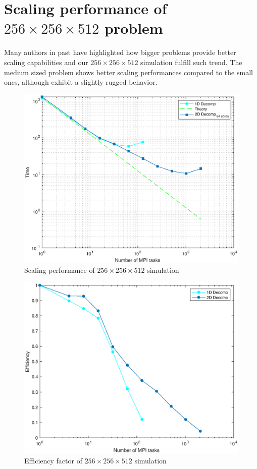 \section{Scaling performance of $256\times 256\times 512$ problem}
Many authors in past have highlighted how bigger problems provide better scaling capabilities and our $256\times 256\times 512$ simulation fulfill such trend.
The medium sized problem shows better scaling performances compared to the small ones, although exhibit a slightly rugged behavior.
\par
\begin{figure}
\begin{center}
\includegraphics[scale=0.55]{grafici/1281}
\caption{Scaling performance of $256\times 256\times 512$  simulation}
\label{1281}
\end{center}
\end{figure}

\begin{figure}
\begin{center}
\includegraphics[scale=0.55]{grafici/1283}
\caption{Efficiency factor of $256\times 256\times 512$  simulation}
\label{1283}
\end{center}
\end{figure}

